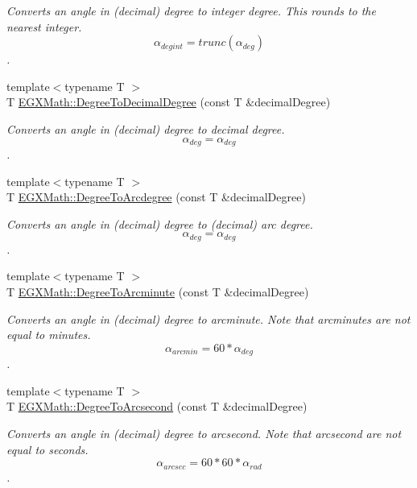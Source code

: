 \begin{DoxyCompactItemize}
\begin{DoxyCompactList}\small\item\em Converts an angle in (decimal) degree to integer degree. This rounds to the nearest integer. \[\alpha_{deg int}=trunc(\alpha_{deg})\]. \end{DoxyCompactList}\item 
{\footnotesize template$<$typename T $>$ }\\T \mbox{\hyperlink{group___e_g_x_math-_angle_conversions-_degree_ga568afc1d436d425bf5d4edea584aee08}{E\+G\+X\+Math\+::\+Degree\+To\+Decimal\+Degree}} (const T \&decimal\+Degree)
\begin{DoxyCompactList}\small\item\em Converts an angle in (decimal) degree to decimal degree. \[\alpha_{deg}=\alpha_{deg}\]. \end{DoxyCompactList}\item 
{\footnotesize template$<$typename T $>$ }\\T \mbox{\hyperlink{group___e_g_x_math-_angle_conversions-_degree_gac1b5f3b68f66c77a6df4ceef842c9b19}{E\+G\+X\+Math\+::\+Degree\+To\+Arcdegree}} (const T \&decimal\+Degree)
\begin{DoxyCompactList}\small\item\em Converts an angle in (decimal) degree to (decimal) arc degree. \[\alpha_{deg}=\alpha_{deg}\]. \end{DoxyCompactList}\item 
{\footnotesize template$<$typename T $>$ }\\T \mbox{\hyperlink{group___e_g_x_math-_angle_conversions-_degree_ga8abf327dc5f52907b2c881999e9cc43e}{E\+G\+X\+Math\+::\+Degree\+To\+Arcminute}} (const T \&decimal\+Degree)
\begin{DoxyCompactList}\small\item\em Converts an angle in (decimal) degree to arcminute. Note that arcminutes are not equal to minutes. \[\alpha_{arcmin}= 60 * \alpha_{deg}\]. \end{DoxyCompactList}\item 
{\footnotesize template$<$typename T $>$ }\\T \mbox{\hyperlink{group___e_g_x_math-_angle_conversions-_degree_gaf85e2d765c248f447854a807a68a5de8}{E\+G\+X\+Math\+::\+Degree\+To\+Arcsecond}} (const T \&decimal\+Degree)
\begin{DoxyCompactList}\small\item\em Converts an angle in (decimal) degree to arcsecond. Note that arcsecond are not equal to seconds. \[\alpha_{arcsec}=60 * 60 * \alpha_{rad}\]. \end{DoxyCompactList}\item 

\end{DoxyCompactItemize}
